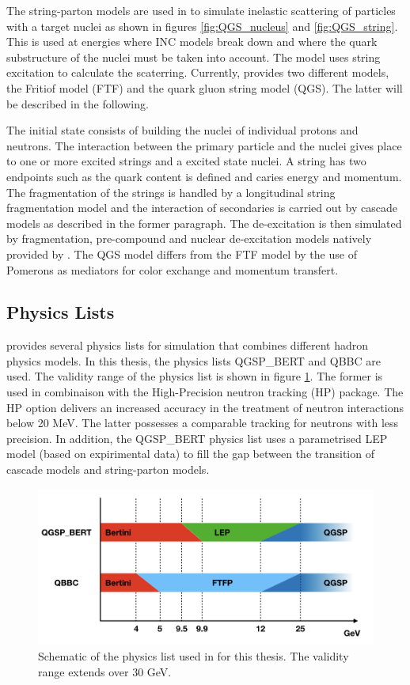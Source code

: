 The string-parton models \cite{Folger2003} are used in \geant to simulate inelastic scattering of particles with a target nuclei as shown in figures \ref{fig:QGS_nucleus} and \ref{fig:QGS_string}. This is used at energies where INC models break down and where the quark substructure of the nuclei must be taken into account. The model uses string excitation to calculate the scaterring. Currently, \geant provides two different models, the Fritiof model (FTF) and the quark gluon string model (QGS). The latter will be described in the following.

The initial state consists of building the nuclei of individual protons and neutrons. The interaction between the primary particle and the nuclei gives place to one or more excited strings and a excited state nuclei. A string has two endpoints such as the quark content is defined and caries energy and momentum. The fragmentation of the strings is handled by a longitudinal string fragmentation model and the interaction of secondaries is carried out by cascade models as described in the former paragraph. The de-excitation is then simulated by fragmentation, pre-compound and nuclear de-excitation models natively provided by \geant. The QGS model differs from the FTF model by the use of Pomerons as mediators for color exchange and momentum transfert.

\subsection{\geant Physics Lists}

\geant provides several physics lists for simulation that combines different hadron physics models. In this thesis, the physics lists QGSP\_BERT and QBBC are used. The validity range of the physics list is shown in figure \ref{fig:physics_list}. The former is used in combinaison with the High-Precision neutron tracking (HP) package. The HP option delivers an increased accuracy in the treatment of neutron interactions below 20 MeV. The latter possesses a comparable tracking for neutrons with less precision.
In addition, the QGSP\_BERT physics list uses a parametrised LEP model (based on expirimental data) to fill the gap between the transition of cascade models and string-parton models.

\begin{figure}[htbp!]
  \centering
  \includegraphics[width=1\linewidth]{chap4/fig/PhysicsLists.jpeg}
  \caption{Schematic of the physics list used in \geant for this thesis. The validity range extends over 30 GeV.} \label{fig:physics_list}
\end{figure}

